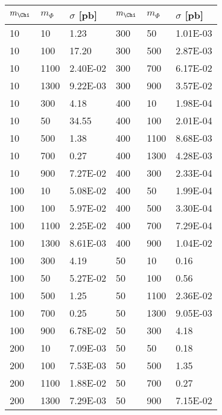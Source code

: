\begin{table}[h]
\centering
{}
\begin{tabular}{lll||lll}
\hline \hline
$m_\Chi $  & $m_\Phi$ & $\sigma$ [pb] & $m_\Chi $  & $m_\Phi$ & $\sigma$ [pb]\\ \hline
10  & 10   & 1.23     & 300 & 50   & 1.01E-03 \\ \hline
10  & 100  & 17.20    & 300 & 500  & 2.87E-03 \\ \hline
10  & 1100 & 2.40E-02 & 300 & 700  & 6.17E-02 \\ \hline
10  & 1300 & 9.22E-03 & 300 & 900  & 3.57E-02 \\ \hline
10  & 300  & 4.18     & 400 & 10   & 1.98E-04 \\ \hline
10  & 50   & 34.55    & 400 & 100  & 2.01E-04 \\ \hline
10  & 500  & 1.38     & 400 & 1100 & 8.68E-03 \\ \hline
10  & 700  & 0.27     & 400 & 1300 & 4.28E-03 \\ \hline
10  & 900  & 7.27E-02 & 400 & 300  & 2.33E-04 \\ \hline
100 & 10   & 5.08E-02 & 400 & 50   & 1.99E-04 \\ \hline
100 & 100  & 5.97E-02 & 400 & 500  & 3.30E-04 \\ \hline
100 & 1100 & 2.25E-02 & 400 & 700  & 7.29E-04 \\ \hline
100 & 1300 & 8.61E-03 & 400 & 900  & 1.04E-02 \\ \hline
100 & 300  & 4.19     & 50  & 10   & 0.16     \\ \hline
100 & 50   & 5.27E-02 & 50  & 100  & 0.56     \\ \hline
100 & 500  & 1.25     & 50  & 1100 & 2.36E-02 \\ \hline
100 & 700  & 0.25     & 50  & 1300 & 9.05E-03 \\ \hline
100 & 900  & 6.78E-02 & 50  & 300  & 4.18     \\ \hline
200 & 10   & 7.09E-03 & 50  & 50   & 0.18     \\ \hline
200 & 100  & 7.53E-03 & 50  & 500  & 1.35     \\ \hline
200 & 1100 & 1.88E-02 & 50  & 700  & 0.27     \\ \hline
200 & 1300 & 7.29E-03 & 50  & 900  & 7.15E-02 \\ \hline

\end{tabular}
\end{table}
